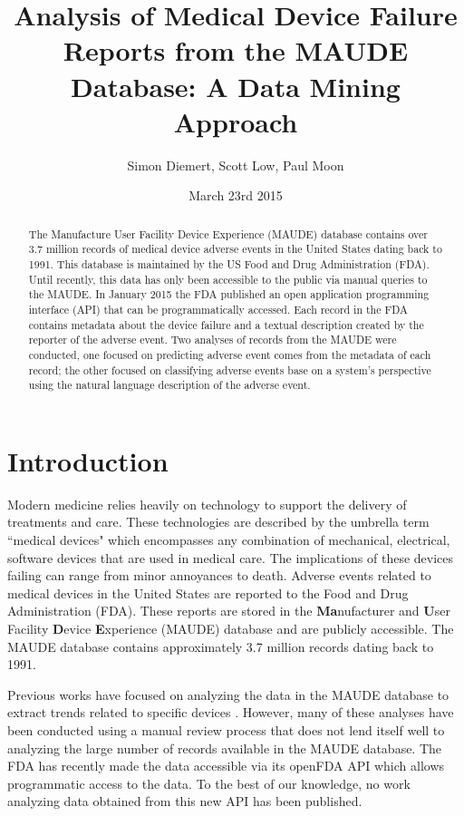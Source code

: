 \documentclass[11pt, notitlepage,abstracton,oneside]{article}   	%
\title{Analysis of Medical Device Failure Reports from the MAUDE Database: A Data Mining Approach}
\author{Simon Diemert, Scott Low, Paul Moon}
\date{March 23rd 2015}							%
\begin{document}
\maketitle

\begin{abstract}


\thispagestyle{empty}
The Manufacture User Facility Device Experience (MAUDE) database contains over 3.7 million records of medical device adverse events in the United States dating back to 1991. This database is maintained by the US Food and Drug Administration (FDA). Until recently, this data has only been accessible to the public via manual queries to the MAUDE. In January 2015 the FDA published an open application programming interface (API) that can be programmatically accessed. Each record in the FDA contains metadata about the device failure and a textual description created by the reporter of the adverse event. Two analyses of records from the MAUDE were conducted, one focused on predicting adverse event comes from the metadata of each record; the other focused on classifying adverse events base on a system's perspective using the natural language description of the adverse event. %
\end{abstract}

\tableofcontents

\clearpage
\newpage
\setcounter{page}{1}
\section{Introduction}
Modern medicine relies heavily on technology to support the delivery of treatments and care. These technologies are described by the umbrella term ``medical devices" which encompasses any combination of mechanical, electrical, software devices that are used in medical care. The implications of these devices failing can range from minor annoyances to death. Adverse events related to medical devices in the United States are reported to the Food and Drug Administration (FDA). These reports are stored in the \textbf{Ma}nufacturer and \textbf{U}ser Facility \textbf{D}evice \textbf{E}xperience (MAUDE) database and are publicly accessible. The MAUDE database contains approximately 3.7 million records dating back to 1991. 

Previous works have focused on analyzing the data in the MAUDE database to extract trends related to specific devices \cite{weber_preliminary_2011}. However, many of these analyses have been conducted using a manual review process that does not lend itself well to analyzing the large number of records available in the MAUDE database. The FDA has recently made the data accessible via its openFDA API which allows programmatic access to the data. To the best of our knowledge, no work analyzing data obtained from this new API has been published.
\end{document}
